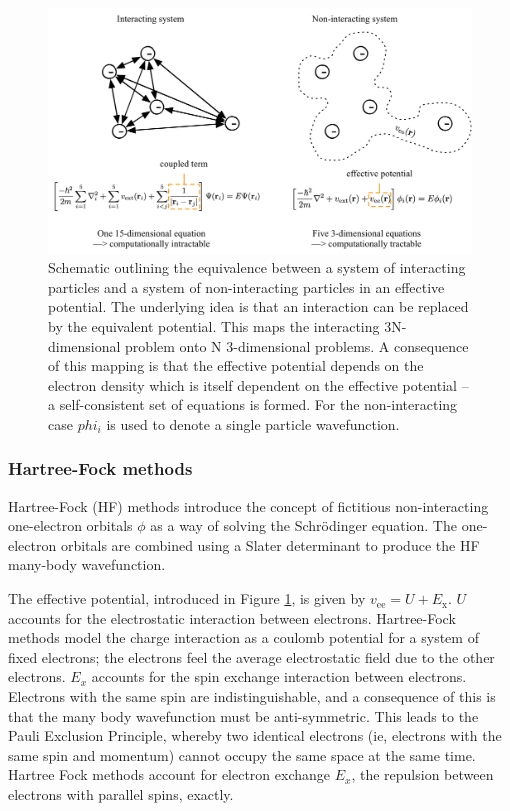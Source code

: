 \begin{figure}[h]
\centering
  \includegraphics[width=1.0\columnwidth]{figures/ch3/decouple.png}
  \caption[Interacting and non-interacting particle systems]{Schematic outlining the equivalence between a system of interacting particles and a system of non-interacting particles in an effective potential. The underlying idea is that an interaction can be replaced by the equivalent potential. This maps the interacting 3N-dimensional problem onto N 3-dimensional problems. A consequence of this mapping is that the effective potential depends on the electron density which is itself dependent on the effective potential -- a self-consistent set of equations is formed. For the non-interacting case $phi_i$ is used to denote a single particle wavefunction.} %
  \label{decouple}
\end{figure}

\subsubsection{Hartree-Fock methods}

Hartree-Fock (HF) methods introduce the concept of fictitious non-interacting one-electron orbitals $\phi$ as a way of solving the Schr\"{o}dinger equation. The one-electron orbitals are combined using a Slater determinant to produce the HF many-body wavefunction.\autocite{Burke2007} 

The effective potential, introduced in Figure \ref{decouple}, is given by $v_{\textrm{ee}} = U + E_{\textrm{x}}$. $U$ accounts for the electrostatic interaction between electrons. Hartree-Fock methods model the charge interaction as a coulomb potential for a system of fixed electrons; the electrons feel the average electrostatic field due to the other electrons.
$E_x$ accounts for the spin exchange interaction between electrons.
Electrons with the same spin are indistinguishable, and a consequence of this is that the many body wavefunction must be anti-symmetric. This leads to the Pauli Exclusion Principle, whereby two identical electrons (ie, electrons with the same spin and momentum) cannot occupy the same space at the same time.
Hartree Fock methods account for electron exchange $E_x$, the repulsion between electrons with parallel spins, exactly. 

